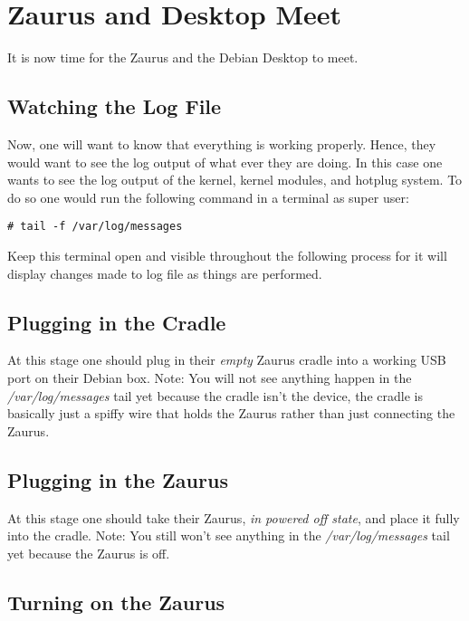 \documentclass{article}
\begin{document}
\section{Zaurus and Desktop Meet}

It is now time for the Zaurus and the Debian Desktop to meet.

\subsection{Watching the Log File}

Now, one will want to know that everything is working properly. Hence, they
would want to see the log output of what ever they are doing. In this case one
wants to see the log output of the kernel, kernel modules, and hotplug
system. To do so one would run the following command in a terminal as super
user:

\begin{verbatim}
# tail -f /var/log/messages
\end{verbatim}

Keep this terminal open and visible throughout the following process for it
will display changes made to log file as things are performed.

\subsection{Plugging in the Cradle}

At this stage one should plug in their \emph{empty} Zaurus cradle into a
working USB port on their Debian box. Note: You will not see anything happen
in the \emph{/var/log/messages} tail yet because the cradle isn't the device,
the cradle is basically just a spiffy wire that holds the
Zaurus rather than just connecting the Zaurus.

\subsection{Plugging in the Zaurus}

At this stage one should take their Zaurus, \emph{in powered off state}, and
place it fully into the cradle. Note: You still won't see anything in the
\emph{/var/log/messages} tail yet because the Zaurus is off.

\subsection{Turning on the Zaurus}
\end{document}
